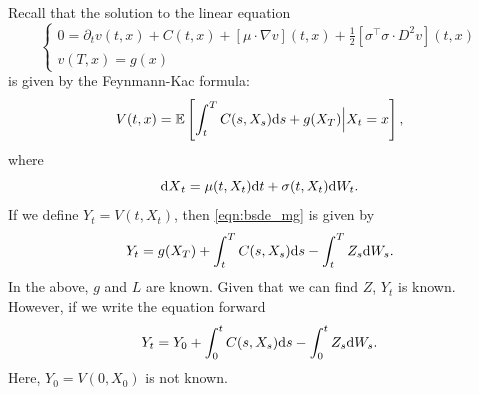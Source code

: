 \documentclass[11pt]{book}
\newcommand{\dt}{\text{\normalfont d}t}
\newcommand{\ds}{\text{\normalfont d}s}
\newcommand{\dX}{\text{\normalfont d}X}
\newcommand{\dW}{\text{\normalfont d}W}
\begin{document}
\begin{eg}
Recall that
the solution to the linear equation 
\begin{equation}
\begin{cases}
		0 =\partial_{t}v(t,x)+C(t,x)+[\mu \cdot\nabla v](t,x)+\frac12[\sigma^\intercal\sigma \cdot D^2v](t,x)\\
v(T,x)=g(x)
\end{cases}		
\end{equation}
is given by the Feynmann-Kac formula:
\begin{equation}
V(t,x)=\mathbb{E}\left[\int_t^T C(s,X_s){{\ds}}+g(X_T)\Big| X_t=x\right],
\end{equation}
where
\begin{equation}
{\dX}_t=\mu(t,X_t){{\dt}}+\sigma(t,X_t)\dW_t.
\end{equation}
If we define $Y_t=V(t,X_t)$, then \eqref{eqn:bsde_mg} is given by 
\begin{equation}
Y_t=g(X_T)+\int_t^T C(s,X_s){{\ds}}-\int_t^TZ_s\dW_s.
\end{equation}
In the above, $g$ and $L$ are known. Given that we can find $Z$, $Y_t$ is known. However, if we write the equation forward
\begin{equation}
Y_t=Y_0+\int_0^t C(s,X_s){{\ds}}-\int_0^tZ_s\dW_s.
\end{equation}
Here, $Y_0=V(0,X_0)$ is not known. 
\end{eg}
\end{document}
